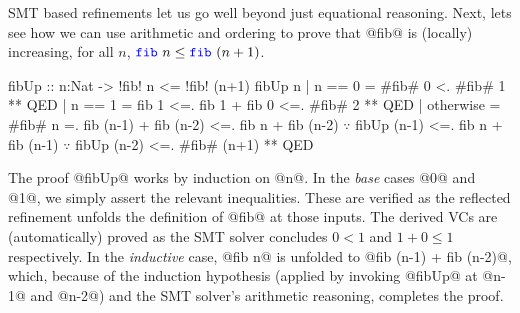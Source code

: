 %
SMT based refinements let us go well beyond just equational
reasoning. Next, lets see how we can use arithmetic and
ordering to prove that @fib@ is (locally) increasing,
%
\ie for all $n$, $\fib{n} \leq \fib{(n+1)}$.
%
\begin{mcode}
    fibUp :: n:Nat -> { !fib! n <= !fib! (n+1) }
    fibUp n | n == 0
            =  #fib# 0 <. #fib# 1 ** QED
            | n == 1
            =  fib 1 <=. fib 1 + fib 0 <=. #fib# 2 ** QED
            | otherwise
            =  #fib# n
            =. fib (n-1) + fib (n-2)
            <=. fib n     + fib (n-2) $\because$ fibUp (n-1)
            <=. fib n     + fib (n-1) $\because$ fibUp (n-2)
            <=. #fib# (n+1) ** QED
\end{mcode} %

%
The proof @fibUp@ works by induction on @n@.
%
In the \emph{base} cases @0@ and @1@, we simply assert
the relevant inequalities. These are verified as the
reflected refinement unfolds the definition of
@fib@ at those inputs.
%
The derived VCs are (automatically) proved
as the SMT solver concludes $0 < 1$ and $1 + 0 \leq 1$
respectively.
%
In the \emph{inductive} case, @fib n@ is unfolded
to  @fib (n-1) + fib (n-2)@, which, because of the
induction hypothesis (applied by invoking @fibUp@
at @n-1@ and @n-2@) and the SMT solver's arithmetic
reasoning, completes the proof.

